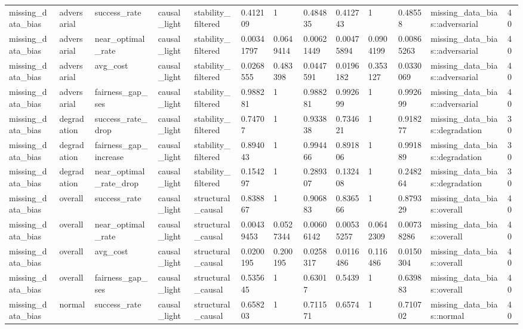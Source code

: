 \begin{tabular}{lllllllllllll}
missing\_data\_bias & adversarial & success\_rate & causal\_light & stability\_filtered & 0.412109 & 1 & 0.484835 & 0.412743 & 1 & 0.48558 & missing\_data\_bias::adversarial & 40 \\
missing\_data\_bias & adversarial & near\_optimal\_rate & causal\_light & stability\_filtered & 0.00341797 & 0.0649414 & 0.00621449 & 0.00475894 & 0.0904199 & 0.00865263 & missing\_data\_bias::adversarial & 40 \\
missing\_data\_bias & adversarial & avg\_cost & causal\_light & stability\_filtered & 0.0268555 & 0.483398 & 0.0447591 & 0.0196182 & 0.353127 & 0.0330069 & missing\_data\_bias::adversarial & 40 \\
missing\_data\_bias & adversarial & fairness\_gap\_ses & causal\_light & stability\_filtered & 0.988281 & 1 & 0.988281 & 0.992699 & 1 & 0.992699 & missing\_data\_bias::adversarial & 40 \\
missing\_data\_bias & degradation & success\_rate\_drop & causal\_light & stability\_filtered & 0.74707 & 1 & 0.933838 & 0.734621 & 1 & 0.918277 & missing\_data\_bias::degradation & 30 \\
missing\_data\_bias & degradation & fairness\_gap\_increase & causal\_light & stability\_filtered & 0.894043 & 1 & 0.994466 & 0.891806 & 1 & 0.991889 & missing\_data\_bias::degradation & 30 \\
missing\_data\_bias & degradation & near\_optimal\_rate\_drop & causal\_light & stability\_filtered & 0.154297 & 1 & 0.289307 & 0.132408 & 1 & 0.248264 & missing\_data\_bias::degradation & 30 \\
missing\_data\_bias & overall & success\_rate & causal\_light & structural\_causal & 0.838867 & 1 & 0.906883 & 0.836566 & 1 & 0.879329 & missing\_data\_bias::overall & 40 \\
missing\_data\_bias & overall & near\_optimal\_rate & causal\_light & structural\_causal & 0.00439453 & 0.0527344 & 0.00606142 & 0.00535257 & 0.0642309 & 0.00738286 & missing\_data\_bias::overall & 40 \\
missing\_data\_bias & overall & avg\_cost & causal\_light & structural\_causal & 0.0200195 & 0.200195 & 0.0258317 & 0.0116486 & 0.116486 & 0.0150304 & missing\_data\_bias::overall & 40 \\
missing\_data\_bias & overall & fairness\_gap\_ses & causal\_light & structural\_causal & 0.535645 & 1 & 0.63017 & 0.5439 & 1 & 0.639883 & missing\_data\_bias::overall & 40 \\
missing\_data\_bias & normal & success\_rate & causal\_light & structural\_causal & 0.658203 & 1 & 0.711571 & 0.6574 & 1 & 0.710702 & missing\_data\_bias::normal & 40 \\

\end{tabular}
